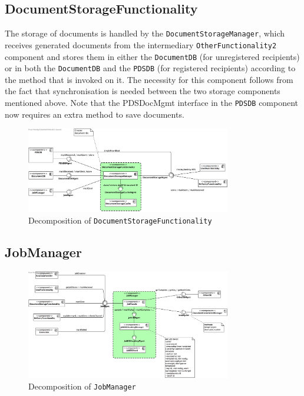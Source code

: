 \documentclass[a4paper,10pt]{article}
\begin{document}
\subsection{DocumentStorageFunctionality}\label{subsec:decomp-DocumentStorageFunctionality}
The storage of documents is handled by the \texttt{DocumentStorageManager}, which receives generated documents from the intermediary \texttt{OtherFunctionality2} component and stores them in either the \texttt{DocumentDB} (for unregistered recipients) or in both the \texttt{DocumentDB} and the \texttt{PDSDB} (for registered recipients) according to the method that is invoked on it. The necessity for this component follows from the fact that synchronisation is needed between the two storage components mentioned above. Note that the PDSDocMgmt interface in the \texttt{PDSDB} component now requires an extra method to save documents.
\begin{figure}[!htp]
	\centering
	\includegraphics[width=0.8\textwidth]{DocumentStorageFunctionality.png}
	\caption{Decomposition of \texttt{DocumentStorageFunctionality}}
	\label{fig:decomp-DocumentStorageFunctionality}
\end{figure}
\FloatBarrier

\subsection{JobManager}\label{subsec:decomp-JobManager}
\begin{figure}[!htp]
	\centering
	\includegraphics[width=0.8\textwidth]{JobManager.png}
	\caption{Decomposition of \texttt{JobManager}}
	\label{fig:decomp-JobManager}
\end{figure}
\FloatBarrier
\end{document}
